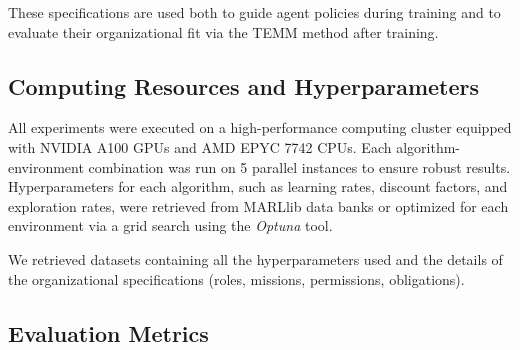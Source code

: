 \documentclass[sigconf,anonymous]{aamas}
\begin{document}
These specifications are used both to guide agent policies during training and to evaluate their organizational fit via the TEMM method after training.

\subsection{Computing Resources and Hyperparameters}

All experiments were executed on a high-performance computing cluster equipped with NVIDIA A100 GPUs and AMD EPYC 7742 CPUs. Each algorithm-environment combination was run on 5 parallel instances to ensure robust results. Hyperparameters for each algorithm, such as learning rates, discount factors, and exploration rates, were retrieved from MARLlib data banks or optimized for each environment via a grid search using the \textit{Optuna} tool.

We retrieved datasets containing all the hyperparameters used and the details of the organizational specifications (roles, missions, permissions, obligations). %

\subsection{Evaluation Metrics}
\end{document}

